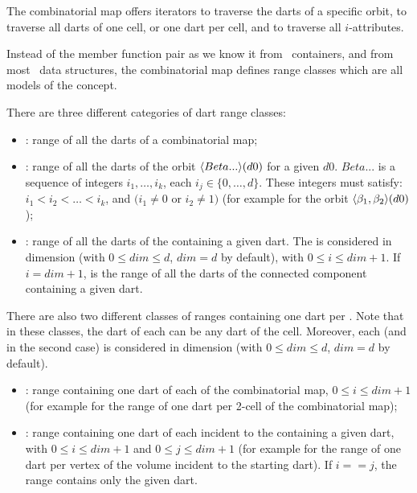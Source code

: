 The combinatorial map offers iterators to traverse the darts
of a specific orbit, to traverse all darts of one cell, or
one dart per cell, and to traverse all $i$-attributes.

Instead of the  member function pair as we know it
from \stl\ containers, and from most \cgal\ data structures, the
combinatorial map defines range classes which are all models of the
 concept.

There are three different categories of dart range classes:
\begin{itemize}
\item {}: range of all the darts of a combinatorial map;
\item {}: range of all the darts of
  the orbit $\langle{}Beta...\rangle{}(d0)$ for a given $d0$.  $Beta...$ is a
  sequence of integers $i_1,\ldots,i_k$, each $i_j \in
  \{0,\ldots,d\}$. These integers must satisfy: $i_1<i_2<\ldots<i_k$,
  and $(i_1\neq 0$ or $i_2 \neq 1)$ (for example
   for the orbit
  $\langle{}\beta_{1},\beta_{2}\rangle{}(d0)$);
\item {}: range of all the darts of
  the  containing a given dart. The  is considered in
  dimension  (with $0 \leq dim \leq d$, $dim=d$ by default),
  with $0\leq i \leq dim+1$. If $i=dim+1$,
   is the range of all the darts of
  the connected component containing a given dart.
\end{itemize}


There are also two different classes of ranges containing one dart per
. Note that in these classes, the dart of each  can
be any dart of the cell. Moreover, each  (and  in the
second case) is considered in dimension  (with $0 \leq dim
\leq d$, $dim=d$ by default).
\begin{itemize}
\item {}: range containing one dart of
  each  of the combinatorial map, $0\leq i \leq dim+1$ (for
  example  for the range of one dart per
  2-cell of the combinatorial map);
\item {}: range
  containing one dart of each  incident to the 
  containing a given dart, with $0\leq i \leq dim+1$ and $0\leq j
  \leq dim+1$ (for example
   for the range of
  one dart per vertex of the volume incident to the starting dart).
  If $i==j$, the range contains only the given dart.
\end{itemize}

